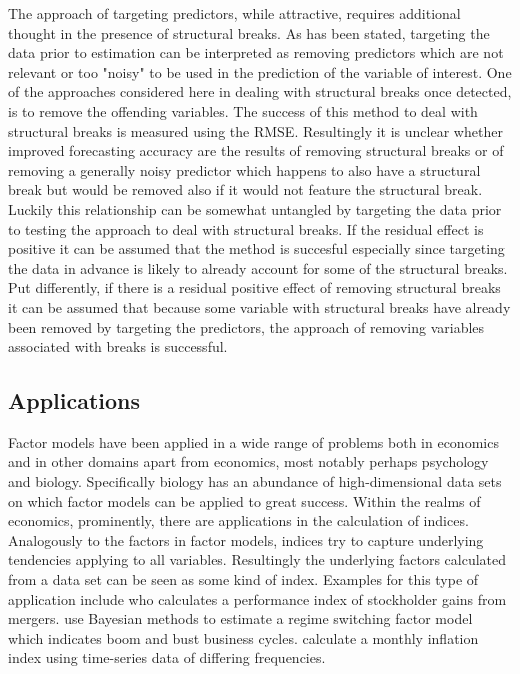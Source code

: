 \documentclass[12pt]{article}
\begin{document}
The approach of targeting predictors, while attractive, requires additional thought in the presence of structural breaks. As has been stated, targeting the data prior to estimation can be interpreted as removing predictors which are not relevant or too "noisy" to be used in the prediction of the variable of interest. One of the approaches considered here in dealing with structural breaks once detected, is to remove the offending variables. The success of this method to deal with structural breaks is measured using the RMSE. Resultingly it is unclear whether improved forecasting accuracy are the results of removing structural breaks or of removing a generally noisy predictor which happens to also have a structural break but would be removed also if it would not feature the structural break. Luckily this relationship can be somewhat untangled by targeting the data prior to testing the approach to deal with structural breaks. If the residual effect is positive it can be assumed that the method is succesful especially since targeting the data in advance is likely to already account for some of the structural breaks. Put differently, if there is a residual positive effect of removing structural breaks it can be assumed that because some variable with structural breaks have already been removed by targeting the predictors, the approach of removing variables associated with breaks is successful.


\subsection{Applications}
Factor models have been applied in a wide range of problems both in economics and in other domains apart from economics, most notably perhaps psychology and biology. Specifically biology has an abundance of high-dimensional data sets on which factor models can be applied to great success. Within the realms of economics, prominently, there are applications in the calculation of indices. Analogously to the factors in factor models, indices try to capture underlying tendencies applying to all variables. Resultingly the underlying factors calculated from a data set can be seen as some kind of index. Examples for this type of application include \citet{langetieg1978application} who calculates a performance index of stockholder gains from mergers. \citet{kim1998business} use Bayesian methods to estimate a regime switching factor model which indicates boom and bust business cycles. \citet{altissimo2001eurocoin} calculate a monthly inflation index using time-series data of differing frequencies.
\end{document}
